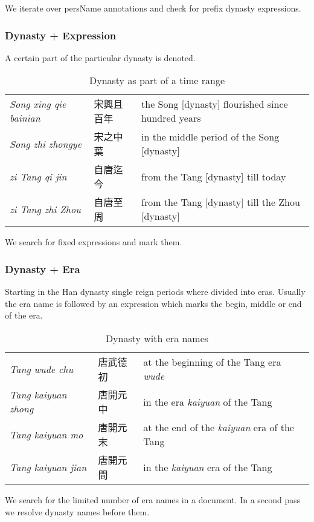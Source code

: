\documentclass[12pt, draft]{article}
\begin{document}
We iterate over persName annotations and check for prefix dynasty expressions.

\subsubsection{Dynasty + Expression}
A certain part of the particular dynasty is denoted.

{\footnotesize
\begin{table}[h]
\caption{Dynasty as part of a time range}
\begin{tabular}{lll}
\emph{Song xing qie bainian} & 宋興且百年 & the Song [dynasty] flourished since hundred years \\
\emph{Song zhi zhongye} & 宋之中葉 & in the middle period of the Song [dynasty] \\
\emph{zi Tang qi jin} & 自唐迄今 & from the Tang [dynasty] till today \\
\emph{zi Tang zhi Zhou} & 自唐至周 & from the Tang [dynasty] till the Zhou [dynasty] \\
\end{tabular}
\end{table}
}

We search for fixed expressions and mark them.

\subsubsection{Dynasty + Era}

Starting in the Han dynasty single reign periods where divided
into eras.  Usually the era name is followed by an expression
which marks the begin, middle or end of the era.

{\footnotesize
\begin{table}[h]
\caption{Dynasty with era names}
\begin{tabular}{lll}
\hline
\emph{Tang wude chu} & 唐武德初 & at the beginning of the Tang era \emph{wude} \\
\emph{Tang kaiyuan zhong } & 唐開元中 & in the era \emph{kaiyuan} of the Tang \\
\emph{Tang kaiyuan mo} & 唐開元末 & at the end of the \emph{kaiyuan} era of the Tang \\
\emph{Tang kaiyuan jian} & 唐開元間 & in the \emph{kaiyuan} era of the Tang \\
\end{tabular}
\end{table}
}

We search for the limited number of era names in a document. In a second pass we
resolve dynasty names before them.
\end{document}

